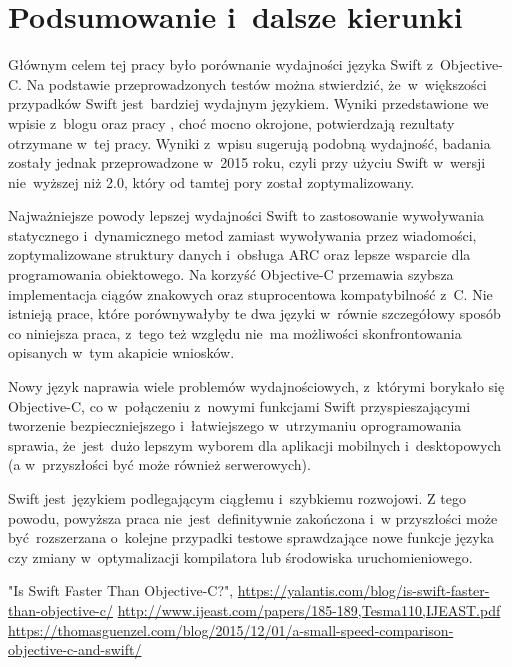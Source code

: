 \documentclass[mgr, shortabstract]{iithesis}
\begin{document}
\chapter{Podsumowanie i~dalsze kierunki}

Głównym celem tej pracy było porównanie wydajności języka Swift z~Objective-C. Na podstawie przeprowadzonych testów można stwierdzić, że~w~większości przypadków Swift jest~bardziej wydajnym językiem. Wyniki przedstawione we wpisie z~blogu \cite{yalantis} oraz pracy \cite{ijeast}, choć mocno okrojone, potwierdzają rezultaty otrzymane w~tej pracy. Wyniki z~wpisu \cite{gunzel} sugerują podobną wydajność, badania zostały jednak przeprowadzone w~2015 roku, czyli przy użyciu Swift w~wersji nie~wyższej niż 2.0, który od tamtej pory został zoptymalizowany.

Najważniejsze powody lepszej wydajności Swift to zastosowanie wywoływania statycznego i~dynamicznego metod zamiast wywoływania przez wiadomości, zoptymalizowane struktury danych i~obsługa ARC oraz lepsze wsparcie dla programowania obiektowego. Na korzyść Objective-C przemawia szybsza implementacja ciągów znakowych oraz stuprocentowa kompatybilność z~C. Nie istnieją prace, które porównywałyby te dwa języki w~równie szczegółowy sposób co niniejsza praca, z~tego też względu nie~ma możliwości skonfrontowania opisanych w~tym akapicie wniosków. 

Nowy język naprawia wiele problemów wydajnościowych, z~którymi borykało się Objective-C, co w~połączeniu z~nowymi funkcjami Swift przyspieszającymi tworzenie bezpieczniejszego i~łatwiejszego w~utrzymaniu oprogramowania sprawia, że~jest~dużo lepszym wyborem dla aplikacji mobilnych i~desktopowych (a w~przyszłości być może również serwerowych).
 
Swift jest~językiem podlegającym ciągłemu i~szybkiemu rozwojowi. Z tego powodu, powyższa praca nie~jest~definitywnie zakończona i~w przyszłości może być rozszerzana o~kolejne przypadki testowe sprawdzające nowe funkcje języka czy zmiany w~optymalizacji kompilatora lub środowiska uruchomieniowego.


\begin{thebibliography}{1}
 "Is Swift Faster Than Objective-C?", \url{https://yalantis.com/blog/is-swift-faster-than-objective-c/}
 \url{http://www.ijeast.com/papers/185-189,Tesma110,IJEAST.pdf}
 \url{https://thomasguenzel.com/blog/2015/12/01/a-small-speed-comparison-objective-c-and-swift/}
\end{thebibliography}                                                                                                                                                          
\end{document}
